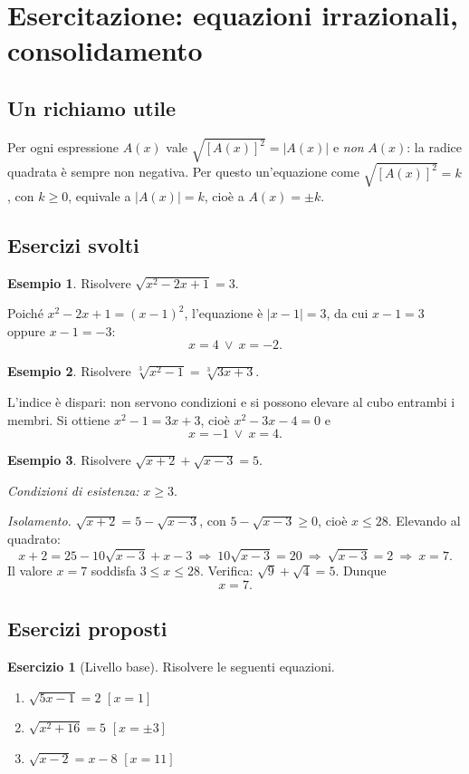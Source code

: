 \documentclass[12pt,a4paper,openany]{book}
\theoremstyle{definition}
\newtheorem{esempio}{Esempio}[section]
\newtheorem{esercizio}{Esercizio}[section]
\theoremstyle{plain}
\theoremstyle{remark}
\newcommand{\abs}[1]{\left|#1\right|}
\begin{document}
\section{Esercitazione: equazioni irrazionali, consolidamento}

\subsection*{Un richiamo utile}

Per ogni espressione $A(x)$ vale $\sqrt{[A(x)]^2}=\abs{A(x)}$ e \emph{non} $A(x)$: la radice quadrata è sempre non negativa. Per questo un'equazione come $\sqrt{[A(x)]^2}=k$, con $k\ge 0$, equivale a $\abs{A(x)}=k$, cioè a $A(x)=\pm k$.

\subsection*{Esercizi svolti}

\begin{esempio}
Risolvere $\sqrt{x^2-2x+1}=3$.

Poiché $x^2-2x+1=(x-1)^2$, l'equazione è $\abs{x-1}=3$, da cui $x-1=3$ oppure $x-1=-3$:
\[
x=4\ \lor\ x=-2.
\]
\end{esempio}

\begin{esempio}
Risolvere $\sqrt[3]{x^2-1}=\sqrt[3]{3x+3}$.

L'indice è dispari: non servono condizioni e si possono elevare al cubo entrambi i membri. Si ottiene $x^2-1=3x+3$, cioè $x^2-3x-4=0$ e
\[
x=-1\ \lor\ x=4.
\]
\end{esempio}

\begin{esempio}
Risolvere $\sqrt{x+2}+\sqrt{x-3}=5$.

\emph{Condizioni di esistenza:} $x\ge 3$.

\emph{Isolamento.} $\sqrt{x+2}=5-\sqrt{x-3}$, con $5-\sqrt{x-3}\ge 0$, cioè $x\le 28$. Elevando al quadrato:
\[
x+2=25-10\sqrt{x-3}+x-3\ \Longrightarrow\ 10\sqrt{x-3}=20\ \Longrightarrow\ \sqrt{x-3}=2\ \Longrightarrow\ x=7.
\]
Il valore $x=7$ soddisfa $3\le x\le 28$. Verifica: $\sqrt9+\sqrt4=5$. Dunque
\[
x=7.
\]
\end{esempio}

\subsection*{Esercizi proposti}

\begin{esercizio}[Livello base]
Risolvere le seguenti equazioni.
\begin{enumerate}[label=\alph*)]
\item $\sqrt{5x-1}=2$ \hfill $[x=1]$
\item $\sqrt{x^2+16}=5$ \hfill $[x=\pm 3]$
\item $\sqrt{x-2}=x-8$ \hfill $[x=11]$
\end{enumerate}
\end{esercizio}
\end{document}

